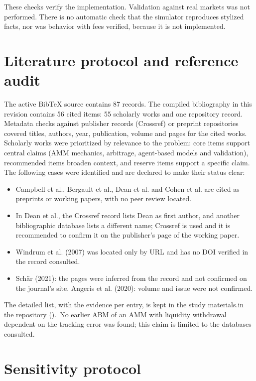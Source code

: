 These checks verify the implementation. Validation against real markets was not performed. There is no automatic check that the simulator reproduces stylized facts, nor was behavior with fees verified, because it is not implemented.

\section{Literature protocol and reference audit}
\label{sec:protocolo-literatura}

The active BibTeX source contains 87 records. The compiled bibliography in this revision contains 56 cited items: 55 scholarly works and one repository record. Metadata checks against publisher records (Crossref) or preprint repositories covered titles, authors, year, publication, volume and pages for the cited works. Scholarly works were prioritized by relevance to the problem: core items support central claims (AMM mechanics, arbitrage, agent-based models and validation), recommended items broaden context, and reserve items support a specific claim. The following cases were identified and are declared to make their status clear:

\begin{itemize}
  \item Campbell et al., Bergault et al., Dean et al. and Cohen et al. are cited as preprints or working papers, with no peer review located.
  \item In Dean et al., the Crossref record lists Dean as first author, and another bibliographic database lists a different name; Crossref is used and it is recommended to confirm it on the publisher's page of the working paper.
  \item Windrum et al. (2007) was located only by URL and has no DOI verified in the record consulted.
  \item Schär (2021): the pages were inferred from the record and not confirmed on the journal's site. Angeris et al. (2020): volume and issue were not confirmed.
\end{itemize}

The detailed list, with the evidence per entry, is kept \ifdefined\blindreviewmode in the study materials.\else in the repository ().\fi\ No earlier ABM of an AMM with liquidity withdrawal dependent on the tracking error was found; this claim is limited to the databases consulted.

\section{Sensitivity protocol}
\label{sec:sensibilidad}

